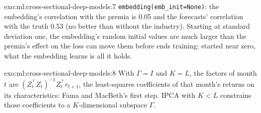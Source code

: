 \begin{solution}{exo:ml:cross-sectional-deep-models:7}
\texttt{embedding(emb\_init=None)}: the embedding's correlation with the premia is 0.05 and the forecasts' correlation with
the truth 0.53 (no better than without the industry). Starting at standard deviation one, the embedding's random initial
values are much larger than the premia's effect on the loss can move them before  ends training; started
near zero, what the embedding learns is all it holds.
\end{solution}

\begin{solution}{exo:ml:cross-sectional-deep-models:8}
With $\Gamma = I$ and $K = L$, the factors of month $t$ are $(Z_t^\top Z_t)^{-1}Z_t^\top r_{t+1}$, the least-squares
coefficients of that month's returns on its characteristics: Fama and MacBeth's first step. IPCA with $K < L$ constrains
those coefficients to a $K$-dimensional subspace $\Gamma$.
\end{solution}

